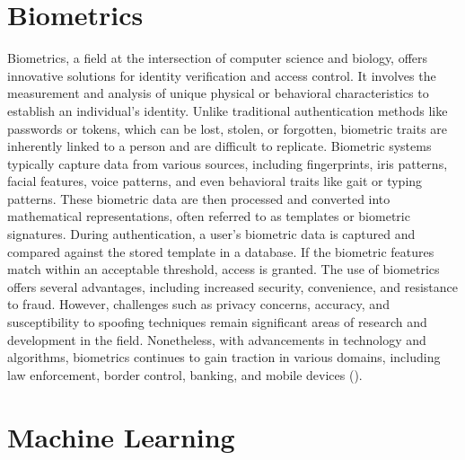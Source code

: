 \documentclass[
]{article}
\begin{document}
\begin{multicols}{2}

\section{Biometrics}
Biometrics, a field at the intersection of computer science and biology, offers innovative solutions for identity verification and access control. It involves the measurement and analysis of unique physical or behavioral characteristics to establish an individual's identity. Unlike traditional authentication methods like passwords or tokens, which can be lost, stolen, or forgotten, biometric traits are inherently linked to a person and are difficult to replicate. Biometric systems typically capture data from various sources, including fingerprints, iris patterns, facial features, voice patterns, and even behavioral traits like gait or typing patterns. These biometric data are then processed and converted into mathematical representations, often referred to as templates or biometric signatures. During authentication, a user's biometric data is captured and compared against the stored template in a database. If the biometric features match within an acceptable threshold, access is granted. The use of biometrics offers several advantages, including increased security, convenience, and resistance to fraud. However, challenges such as privacy concerns, accuracy, and susceptibility to spoofing techniques remain significant areas of research and development in the field. Nonetheless, with advancements in technology and algorithms, biometrics continues to gain traction in various domains, including law enforcement, border control, banking, and mobile devices (\cite{wang2023introduction}).

\section{Machine Learning}


\end{multicols}
\end{document}

